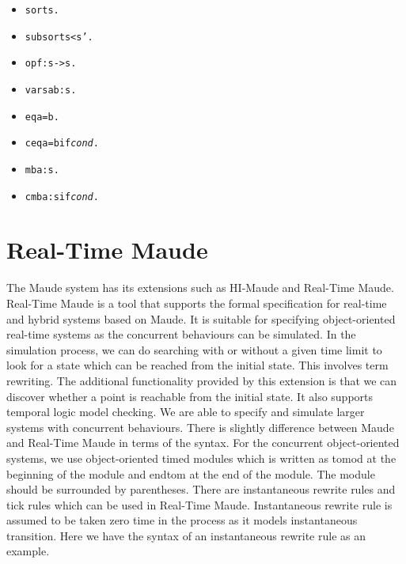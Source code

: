 \documentclass{report}
\begin{document}
\begin{itemize}
  \item \begin{alltt}sort s . \end{alltt}
  \item \begin{alltt}subsort s < s' . \end{alltt}
  \item \begin{alltt}op f : s -> s . \end{alltt}
	\item \begin{alltt}vars a b : s . \end{alltt}
	\item \begin{alltt}eq a = b . \end{alltt}
	\item \begin{alltt}ceq a = b if \textit{cond} . \end{alltt}
	\item \begin{alltt}mb a : s . \end{alltt}
	\item \begin{alltt}cmb a : s if \textit{cond} . \end{alltt}
\end{itemize}

\newpage
\section{Real-Time Maude}
The Maude system has its extensions such as HI-Maude and Real-Time Maude.
Real-Time Maude is a tool that supports the formal specification for real-time and hybrid systems based on Maude. It is suitable for specifying object-oriented real-time systems as the concurrent behaviours can be simulated. In the simulation process, we can do searching with or without a given time limit to look for a state which can be reached from the initial state. This involves term rewriting. The additional functionality provided by this extension is that we can discover whether a point is reachable from the initial state. It also supports temporal logic model checking. We are able to specify and simulate larger systems with concurrent behaviours. 
\newline There is slightly difference between Maude and Real-Time Maude in terms of the syntax. For the concurrent object-oriented systems, we use object-oriented timed modules which is written as tomod at the beginning of the module and endtom at the end of the module. The module should be surrounded by parentheses. There are instantaneous rewrite rules and tick rules which can be used in Real-Time Maude. Instantaneous rewrite rule is assumed to be taken zero time in the process as it models instantaneous transition. Here we have the syntax of an instantaneous rewrite rule as an example.
\end{document}
